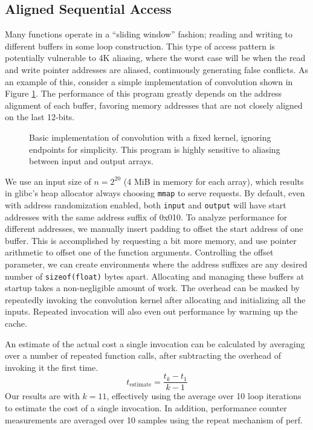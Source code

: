 \documentclass[10pt, conference, compsocconf]{IEEEtran}
\begin{document}
\subsection{Aligned Sequential Access}
Many functions operate in a ``sliding window'' fashion; reading and writing to different buffers in some loop construction.
This type of access pattern is potentially vulnerable to 4K aliasing, where the worst case will be when the read and write pointer addresses are aliased, continuously generating false conflicts.
As an example of this, consider a simple implementation of convolution shown in Figure \ref{lst:conv}.
The performance of this program greatly depends on the address alignment of each buffer, favoring memory addresses that are not closely aligned on the last 12-bits.

\begin{figure}[t]
  \centering
  
  \caption{Basic implementation of convolution with a fixed kernel, ignoring endpoints for simplicity. This program is highly sensitive to aliasing between input and output arrays.}
  \label{lst:conv}
\end{figure}

We use an input size of $n=2^{20}$ (4 MiB in memory for each array), which results in glibc's heap allocator always choosing \texttt{mmap} to serve requests.
By default, even with address randomization enabled, both \texttt{input} and \texttt{output} will have start addresses with the same address suffix of 0x010.
To analyze performance for different addresses, we manually insert padding to offset the start address of one buffer.
This is accomplished by requesting a bit more memory, and use pointer arithmetic to offset one of the function arguments.
Controlling the offset parameter, we can create environments where the address suffixes are any desired number of \texttt{sizeof(float)} bytes apart.
Allocating and managing these buffers at startup takes a non-negligible amount of work.
The overhead can be masked by repeatedly invoking the convolution kernel after allocating and initializing all the inputs.
Repeated invocation will also even out performance by warming up the cache.

An estimate of the actual cost a single invocation can be calculated by averaging over a number of repeated function calls, after subtracting the overhead of invoking it the first time.
\[
t_{\text{estimate}} = \frac{t_{k} - t_{1}}{k - 1}
\]
Our results are with $k=11$, effectively using the average over 10 loop iterations to estimate the cost of a single invocation.
In addition, performance counter measurements are averaged over 10 samples using the repeat mechanism of perf.
\end{document}
